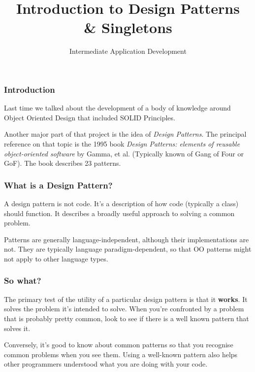 \documentclass[10pt]{beamer}
\title{Introduction to Design Patterns \\ \& Singletons}
\author[IN608]{Intermediate Application Development}
\institute[Otago Polytechnic]{
  Otago Polytechnic \\
  Dunedin, New Zealand \\
  Kaiako: Tom Clark
}
\date{}
\begin{document}
\begin{frame}[plain]
  \titlepage
\end{frame}

\begin{frame}
  \frametitle{Introduction}
  
    Last time we talked about the development of a body of knowledge 
    around Object Oriented Design that included SOLID Principles.
    
    \vspace{5mm}
    Another major part of that project is the idea of \emph{Design Patterns}.
    The principal reference on that topic is the 1995 book \emph{Design Patterns: elements of
    reusable object-oriented software} by Gamma, et al. (Typically known of Gang of Four or GoF).
    The book describes 23 patterns.
\end{frame}

\begin{frame}
  \frametitle{What is a Design Pattern?}
  
  A design pattern is not code. It's a description of how code (typically a class)
  should function. It describes a broadly useful approach to solving a common problem.
  
  \vspace{5mm}
  Patterns are generally language-independent, although their implementations are not.
  They are typically language paradigm-dependent, so that OO patterns might not apply to 
  other language types. 
  
  \vspace{5mm}
  

  
\end{frame}

\begin{frame}
  \frametitle{So what?}
  
  The primary test of the utility of a particular design pattern is that it
  \textbf{works}. It solves the problem it's intended to solve. When you're confronted 
  by a problem that is probably pretty common, look to see if there is a well known pattern
  that solves it.
  
  \vspace{5mm}
  Conversely, it's good to know about common patterns so that you recognise common problems when you 
  see them. Using a well-known pattern also helps other programmers understood what you are doing with your code.
     
\end{frame}
\end{document}
